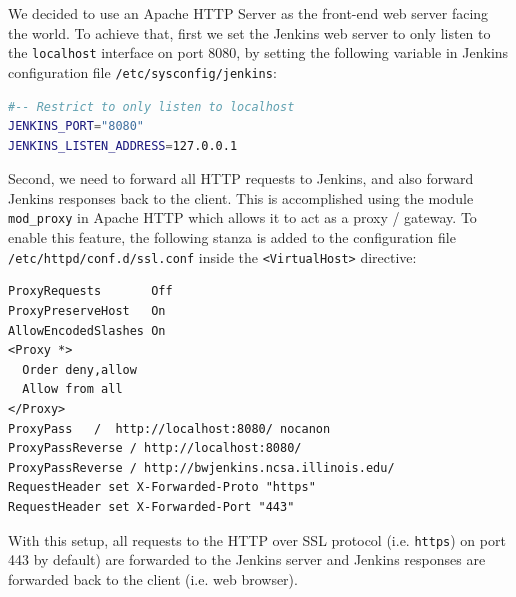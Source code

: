 \documentclass[AMA]{WileyNJD-v1}
\begin{document}
We decided to use an Apache HTTP Server as the front-end web server facing the world. 
To achieve that, first we set the Jenkins web server to only listen to the \texttt{localhost} interface on port 8080, by setting the following variable in Jenkins configuration file \texttt{/etc/sysconfig/jenkins}:
\begin{lstlisting}[captionpos=t,language=bash,label=lst:jenkinsConfig]
#-- Restrict to only listen to localhost
JENKINS_PORT="8080"
JENKINS_LISTEN_ADDRESS=127.0.0.1
\end{lstlisting}

Second, we need to forward all HTTP requests to Jenkins, and also forward Jenkins responses back to the client. 
This is accomplished using the module \texttt{mod_proxy} \cite{ApacheModProxy} in Apache HTTP which allows it to act as a proxy / gateway. 
To enable this feature, the following stanza is added to the configuration file \texttt{/etc/httpd/conf.d/ssl.conf} inside the \texttt{<VirtualHost>} directive:

\begin{lstlisting}[frame=b,captionpos=b,label=lst:reverseProxy,caption=Relevant configuration lines for setting up reverse proxy in Apache HTTP Server]
ProxyRequests       Off
ProxyPreserveHost   On 
AllowEncodedSlashes On 
<Proxy *>
  Order deny,allow
  Allow from all  
</Proxy>
ProxyPass   /  http://localhost:8080/ nocanon
ProxyPassReverse / http://localhost:8080/
ProxyPassReverse / http://bwjenkins.ncsa.illinois.edu/
RequestHeader set X-Forwarded-Proto "https"
RequestHeader set X-Forwarded-Port "443"    
\end{lstlisting}

With this setup, all requests to the HTTP over SSL protocol (i.e. \texttt{https}) on port 443 by default) are forwarded to the Jenkins server and Jenkins responses are forwarded back to the client (i.e. web browser).
\end{document}
